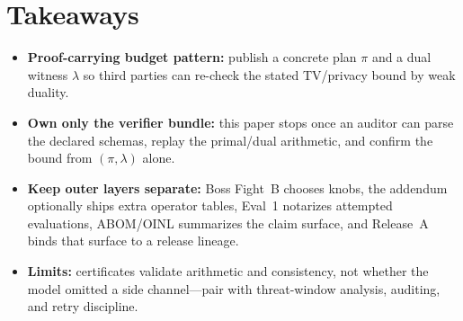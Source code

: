 \documentclass[11pt]{article}
\begin{document}
\section{Takeaways}
\begin{itemize}[leftmargin=*]
\item \textbf{Proof-carrying budget pattern:} publish a concrete plan $\pi$ and a dual witness $\lambda$ so third parties can re-check the stated TV/privacy bound by weak duality.
\item \textbf{Own only the verifier bundle:} this paper stops once an auditor can parse the declared schemas, replay the primal/dual arithmetic, and confirm the bound from $(\pi,\lambda)$ alone.
\item \textbf{Keep outer layers separate:} Boss Fight~B chooses knobs, the addendum optionally ships extra operator tables, Eval~1 notarizes attempted evaluations, ABOM/OINL summarizes the claim surface, and Release~A binds that surface to a release lineage.
\item \textbf{Limits:} certificates validate arithmetic and consistency, not whether the model omitted a side channel---pair with threat-window analysis, auditing, and retry discipline.
\end{itemize}
\end{document}
